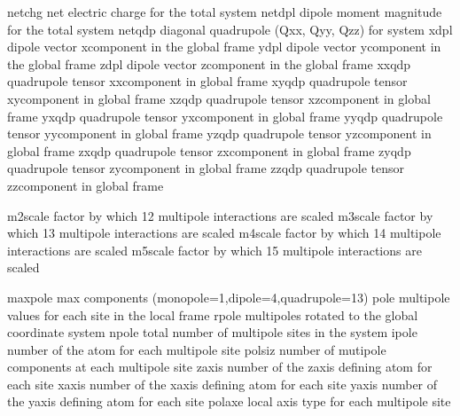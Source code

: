 \documentclass[letterpaper,11pt,english]{sphinxmanual}
\begin{document}
\begin{sphinxVerbatim}[commandchars=\\\{\}]
netchg          net electric charge for the total system
netdpl          dipole moment magnitude for the total system
netqdp          diagonal quadrupole (Qxx, Qyy, Qzz) for system
xdpl            dipole vector x\PYGZhy{}component in the global frame
ydpl            dipole vector y\PYGZhy{}component in the global frame
zdpl            dipole vector z\PYGZhy{}component in the global frame
xxqdp           quadrupole tensor xx\PYGZhy{}component in global frame
xyqdp           quadrupole tensor xy\PYGZhy{}component in global frame
xzqdp           quadrupole tensor xz\PYGZhy{}component in global frame
yxqdp           quadrupole tensor yx\PYGZhy{}component in global frame
yyqdp           quadrupole tensor yy\PYGZhy{}component in global frame
yzqdp           quadrupole tensor yz\PYGZhy{}component in global frame
zxqdp           quadrupole tensor zx\PYGZhy{}component in global frame
zyqdp           quadrupole tensor zy\PYGZhy{}component in global frame
zzqdp           quadrupole tensor zz\PYGZhy{}component in global frame
\end{sphinxVerbatim}


\begin{sphinxVerbatim}[commandchars=\\\{\}]
m2scale         factor by which 1\PYGZhy{}2 multipole interactions are scaled
m3scale         factor by which 1\PYGZhy{}3 multipole interactions are scaled
m4scale         factor by which 1\PYGZhy{}4 multipole interactions are scaled
m5scale         factor by which 1\PYGZhy{}5 multipole interactions are scaled
\end{sphinxVerbatim}


\begin{sphinxVerbatim}[commandchars=\\\{\}]
maxpole         max components (monopole=1,dipole=4,quadrupole=13)
pole            multipole values for each site in the local frame
rpole           multipoles rotated to the global coordinate system
npole           total number of multipole sites in the system
ipole           number of the atom for each multipole site
polsiz          number of mutipole components at each multipole site
zaxis           number of the z\PYGZhy{}axis defining atom for each site
xaxis           number of the x\PYGZhy{}axis defining atom for each site
yaxis           number of the y\PYGZhy{}axis defining atom for each site
polaxe          local axis type for each multipole site
\end{sphinxVerbatim}
\end{document}
